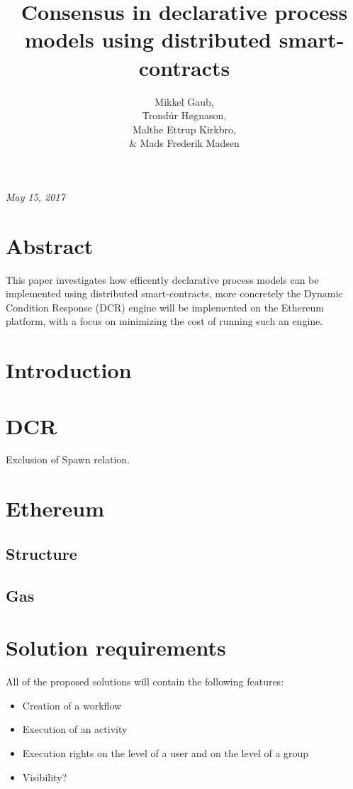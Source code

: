\documentclass{paper}
\title{Consensus in declarative process models using distributed smart-contracts}
\author{Mikkel Gaub, \\ Trondúr Høgnason, \\ Malthe Ettrup Kirkbro, \\ \& Mads Frederik Madsen }
\date{}
\begin{document}
	\begin{titlepage}
		\maketitle		
		\hspace{-18pt}
		\textit{May 15, 2017}
		\vspace{\fill}
		\section*{Abstract}
		This paper investigates how efficently declarative process models can be implemented using distributed smart-contracts, more concretely the Dynamic Condition Response (DCR) engine will be implemented on the Ethereum platform, with a focus on minimizing the cost of running such an engine.
		\thispagestyle{empty}
	\end{titlepage}
	\clearpage

	\setcounter{page}{1}

	\tableofcontents
	\pagebreak

	\section{Introduction}

	\section{DCR}

	Exclusion of Spawn relation.

	\section{Ethereum}

		\subsection{Structure}

		\subsection{Gas}

	\section{Solution requirements}

	All of the proposed solutions will contain the following features:
	\begin{itemize}
		\item Creation of a workflow
		\item Execution of an activity
		\item Execution rights on the level of a user and on the level of a group
		\item Visibility?
	\end{itemize}
\end{document}
